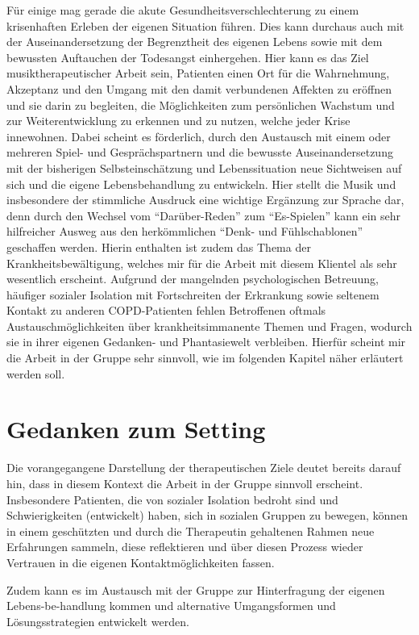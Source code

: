 Für einige mag gerade die akute Gesundheitsverschlechterung zu einem krisenhaften Erleben der eigenen Situation führen. Dies kann durchaus auch mit der Auseinandersetzung der Begrenztheit des eigenen Lebens sowie mit dem bewussten Auftauchen der Todesangst einhergehen. Hier kann es das Ziel musiktherapeutischer Arbeit sein, Patienten einen Ort für die Wahrnehmung, Akzeptanz und den Umgang mit den damit verbundenen Affekten zu eröffnen und sie darin zu begleiten, die Möglichkeiten zum persönlichen Wachstum und zur Weiterentwicklung zu erkennen und zu nutzen, welche jeder Krise innewohnen. Dabei scheint es förderlich, durch den Austausch mit einem oder mehreren Spiel- und Gesprächspartnern und die bewusste Auseinandersetzung mit der bisherigen Selbsteinschätzung und Lebenssituation neue Sichtweisen auf sich und die eigene Lebensbehandlung zu entwickeln. Hier stellt die Musik und insbesondere der stimmliche Ausdruck eine wichtige Ergänzung zur Sprache dar, denn durch den Wechsel vom "`Darüber-Reden"' zum "`Es-Spielen"' kann ein sehr hilfreicher Ausweg aus den herkömmlichen "`Denk- und Fühlschablonen"' geschaffen werden. Hierin enthalten ist zudem das Thema der Krankheitsbewältigung, welches mir für die Arbeit mit diesem Klientel als sehr wesentlich erscheint. Aufgrund der mangelnden psychologischen Betreuung, häufiger sozialer Isolation mit Fortschreiten der Erkrankung sowie seltenem Kontakt zu anderen COPD-Patienten fehlen Betroffenen oftmals Austauschmöglichkeiten über krankheitsimmanente Themen und Fragen, wodurch sie in ihrer eigenen Gedanken- und Phantasiewelt verbleiben. Hierfür scheint mir die Arbeit in der Gruppe sehr sinnvoll, wie im folgenden Kapitel näher erläutert werden soll.

\section{Gedanken zum Setting}
\label{section:gedanken_zum_setting}
Die vorangegangene Darstellung der therapeutischen Ziele deutet bereits darauf hin, dass in diesem Kontext die Arbeit in der Gruppe sinnvoll erscheint. Insbesondere Patienten, die von sozialer Isolation bedroht sind und Schwierigkeiten (entwickelt) haben, sich in sozialen Gruppen zu bewegen, können in einem geschützten und durch die Therapeutin gehaltenen Rahmen neue Erfahrungen sammeln, diese reflektieren und über diesen Prozess wieder Vertrauen in die eigenen Kontaktmöglichkeiten fassen.

Zudem kann es im Austausch mit der Gruppe zur Hinterfragung der eigenen \mbox{Lebens-be-handlung} kommen und alternative Umgangsformen und Lösungsstrategien entwickelt werden. 

